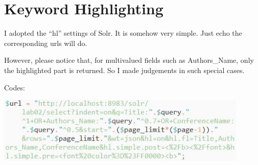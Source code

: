\documentclass[10pt,twoside,a4paper,titlepage]{article}
\begin{document}
	\section{Keyword Highlighting}
		I adopted the “hl” settings of Solr. It is somehow very simple. Just echo the corresponding urls will do.\par
		However, please notice that, for multivalued fields such as Authors\_Name, only the highlighted part is returned. So I made judgements in such special cases.\newline\par
		Codes:\newline\par
		\includegraphics[width=0.9\textwidth]{gzl/02.jpg}






\end{document}
